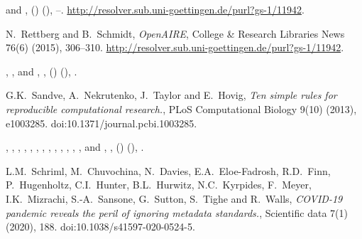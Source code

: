\documentclass[ds,v1.1.2,openaccess]{iosart2x}%
\begin{document}
\begin{thebibliography}{}
%
\begin{barticle}
 and
,
()
(),
--.
\url{http://resolver.sub.uni-goettingen.de/purl?gs-1/11942}.
\end{barticle}
%
\OrigBibText
N.~Rettberg and
B.~Schmidt,
\textit{OpenAIRE},
College \& Research Libraries News
76(6)
(2015),
306--310.
\url{http://resolver.sub.uni-goettingen.de/purl?gs-1/11942}.
\endOrigBibText
{}
\endbibitem

%
\begin{barticle}
,
,
 and
,
,
()
(),
.
\end{barticle}
%
\OrigBibText
G.K.~Sandve,
A.~Nekrutenko,
J.~Taylor and
E.~Hovig,
\textit{Ten simple rules for reproducible computational research.},
{PLoS} Computational Biology
9(10)
(2013),
e1003285.
doi:10.1371/journal.pcbi.1003285.
\endOrigBibText
{}
\endbibitem

%
\begin{barticle}
,
,
,
,
,
,
,
,
,
,
,
,
,
 and
,
,
()
(),
.
\end{barticle}
%
\OrigBibText
L.M.~Schriml,
M.~Chuvochina,
N.~Davies,
E.A.~Eloe-Fadrosh,
R.D.~Finn,
P.~Hugenholtz,
C.I.~Hunter,
B.L.~Hurwitz,
N.C.~Kyrpides,
F.~Meyer,
I.K.~Mizrachi,
S.-A.~Sansone,
G.~Sutton,
S.~Tighe and
R.~Walls,
\textit{{COVID}-19 pandemic reveals the peril of ignoring metadata
standards.},
Scientific data
7(1)
(2020),
188.
doi:10.1038/s41597-020-0524-5.
\endOrigBibText
{}
\endbibitem


\end{thebibliography}
\end{document}
